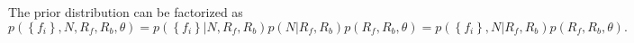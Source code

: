 \documentclass[aps,prd]{revtex4-1}
\newcommand{\mathset}[1]{\left\{ #1 \right\}}
\newcommand{\ilya}[1]{{\color{red} \bf #1}}
\begin{document}
%

The prior distribution can be factorized as
\begin{equation}
  \label{eq:combined-flag-rate-prior}
  p\left(\mathset{f_i}, N, R_f, R_b, \theta\right) = p\left(
  \mathset{f_i} | N, R_f, R_b\right) p\left(N |R_f, R_b\right)
  p\left(R_f, R_b, \theta\right) = p\left( \mathset{f_i},N | R_f,
  R_b\right) p\left(R_f, R_b, \theta\right).
 \end{equation}
 
\end{document}
